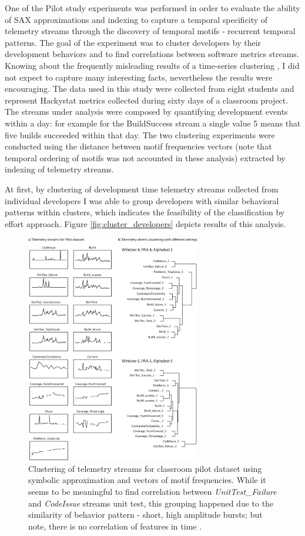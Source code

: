 \documentclass{sig-alternate}
\begin{document}
One of the Pilot study experiments was performed in order to evaluate the ability of SAX approximations and indexing to capture a temporal specificity of telemetry streams through the discovery of temporal motifs - recurrent temporal patterns. The goal of the experiment was to cluster developers by their development behaviors and to find correlations between software metrics streams. Knowing about the frequently misleading results of a time-series clustering \cite{citeulike:227029}, I did not expect to capture many interesting facts, nevertheless the results were encouraging. The data used in this study were collected from eight students and represent Hackystat metrics collected during sixty days of a classroom project. The streams under analysis were composed by quantifying development events within a day: for example for the BuildSuccess stream a single value 5 means that five builds succeeded within that day.  The two clustering experiments were conducted using the distance between motif frequencies vectors (note that temporal ordering of motifs was not accounted in these analysis) extracted by indexing of telemetry streams.

At first, by clustering of development time telemetry streams collected from individual developers I was able to group developers with similar behavioral patterns within clusters, which indicates the feasibility of the classification by effort approach. Figure \ref{fig:cluster_developers} depicts results of this analysis.

\begin{figure}[tbp]
   \centering
   \includegraphics[height=100mm]{cluster_streams.eps}
   \caption{Clustering of telemetry streams for classroom pilot dataset using symbolic approximation and vectors of motif frequencies. While it seems to be meaningful to find correlation between \textit{UnitTest\_Failure} and \textit{CodeIssue} streams unit test, this grouping happened due to the similarity of behavior pattern - short, high amplitude bursts; but note, there is no correlation of features in time .}
   \label{fig:cluster_streams}
\end{figure}
\end{document}
